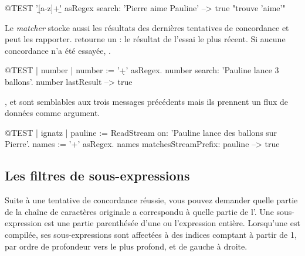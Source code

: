 \documentclass[a4paper,10pt,twoside]{book}
\begin{document}
{\begin{code}{@TEST}
'\b[a-z]+\b' asRegex search: 'Pierre aime Pauline' --> true    "trouve 'aime'"
\end{code}

Le \emph{matcher} stocke aussi les résultats des dernières tentatives
de concordance et peut les rapporter.
 retourne un : le résultat
de l'essai le plus récent. Si aucune concordance n'a été essayée, .

\begin{code}{@TEST | number |}
number := '\d+' asRegex.
number search: 'Pauline lance 3 ballons'.
number lastResult --> true
\end{code}

,
 et
 sont semblables aux trois messages
précédents mais ils prennent un flux de données comme argument.

\begin{code}{@TEST | ignatz |}
pauline := ReadStream on: 'Pauline lance des ballons sur Pierre'.
names := '\<[A-Z][a-z]+\>' asRegex.
names matchesStreamPrefix: pauline --> true
\end{code}

\subsection{Les filtres de sous-expressions}

Suite à une tentative de concordance réussie, vous pouvez demander
quelle partie de la chaîne de caractères originale a correspondu à
quelle partie de l'\expreg. Une sous-expression est une partie
parenthésée d'une \expreg ou l'expression entière.
Lorsqu'une \expreg est compilée, ses sous-expressions sont affectées à
des indices comptant à partir de 1, par ordre de profondeur
  vers le plus profond, et de gauche à droite. 

}
\end{document}
